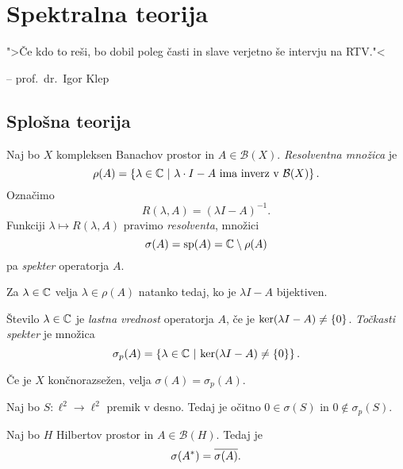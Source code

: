 \section{Spektralna teorija}

\epigraph{">Če kdo to reši, bo dobil poleg časti in slave verjetno
še intervju na RTV."<}{-- prof.~dr.~Igor Klep}

\subsection{Splošna teorija}

\begin{definicija}
Naj bo $X$ kompleksen Banachov prostor in $A \in \mathcal{B}(X)$.
\emph{Resolventna množica} je
\[
\rho(A) = \left\{\lambda \in \mathbb{C}~\middle\vert~\text{$\lambda \cdot I - A$ ima inverz v $\mathcal{B}(X)$}\right\}.
\]
Označimo
\[
R(\lambda, A) = (\lambda I - A)^{-1}.
\]
Funkciji $\lambda \mapsto R(\lambda,A)$ pravimo \emph{resolventa},
množici
\[
\sigma(A) = \operatorname{sp}(A) = \mathbb{C} \setminus \rho(A)
\]
pa \emph{spekter} operatorja $A$.
\end{definicija}

\begin{opomba}
Za $\lambda \in \mathbb{C}$ velja $\lambda \in \rho(A)$ natanko tedaj, ko
je $\lambda I - A$ bijektiven.
\end{opomba}

\begin{definicija}
Število $\lambda \in \mathbb{C}$ je
\emph{lastna vrednost} operatorja
$A$, če je $\ker(\lambda I - A) \ne \left\{0\right\}$.
\emph{Točkasti spekter} je množica
\[
\sigma_p (A) =
\left\{\lambda \in \mathbb{C}~\middle\vert~\ker(\lambda I - A) \ne \left\{0\right\}\right\}.
\]
\end{definicija}

\begin{opomba}
Če je $X$ končnorazsežen, velja $\sigma(A) = \sigma_p(A)$.
\end{opomba}

\begin{zgled}
Naj bo $S \colon \ell^2 \to \ell^2$ premik v desno. Tedaj je očitno
$0 \in \sigma(S)$ in $0 \not \in \sigma_p(S)$.
\end{zgled}

\begin{trditev}
Naj bo $H$ Hilbertov prostor in $A \in \mathcal{B}(H)$. Tedaj je
\[
\sigma(A^*) = \overline{\sigma(A)}.
\]
\end{trditev}

